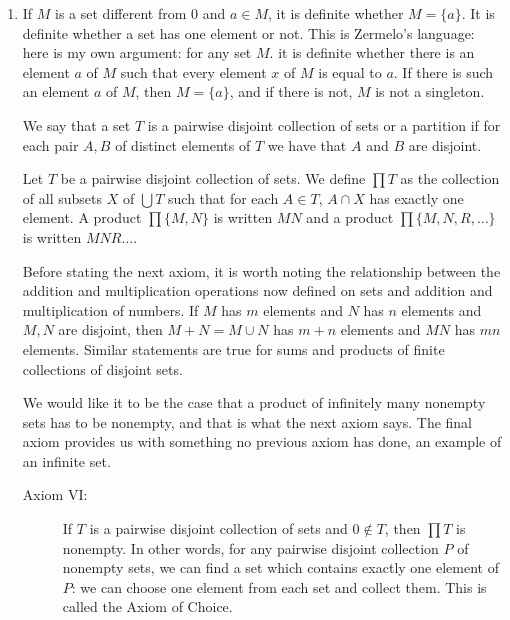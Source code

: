 \documentclass[12pt]{article}
\begin{document}
\begin{enumerate}
\item If $M$ is a set different from 0 and $a \in M$, it is definite whether $M=\{a\}$.  It is definite whether a set has one element or not.  This is Zermelo's language:  here is my own argument:  for any set $M$. it is definite whether there is an element $a$ of $M$ such that every element $x$ of $M$ is equal to $a$.  If there is such an element $a$ of $M$, then $M=\{a\}$, and if there is not, $M$ is not a singleton.

We say that a set $T$ is a pairwise disjoint collection of sets or a partition if for each pair $A,B$ of distinct elements of $T$ we have that $A$ and $B$ are disjoint.

Let $T$ be a pairwise disjoint collection of sets.  We define $\prod T$ as the collection of all subsets $X$ of $\bigcup T$ such that for each $A \in T$, $A\cap X$ has exactly one element.
A product $\prod\{M,N\}$ is written $MN$ and a product $\prod\{M,N,R,\ldots\}$ is written $MNR\ldots$.

Before stating the next axiom, it is worth noting the relationship between the addition and multiplication operations now defined on sets and addition and multiplication of numbers.
If $M$ has $m$ elements and $N$ has $n$ elements and $M,N$ are disjoint, then $M+N = M \cup N$ has $m+n$ elements and $MN$ has $mn$ elements.  Similar statements are true for sums and products of finite collections of disjoint sets.

We would like it to be the case that a product of infinitely many nonempty sets has to be nonempty, and that is what the next axiom says.  The final axiom provides us with something no previous axiom has done, an example of an infinite set.

\begin{description}

\item[Axiom VI:]  If $T$ is a pairwise disjoint collection of sets and $0 \not\in T$, then $\prod T$ is nonempty.  In other words, for any pairwise disjoint collection $P$ of nonempty sets, we can find a set which contains exactly one element of $P$:  we can choose one element from each set and collect them.  This is called the Axiom of Choice.


\end{description}
\end{enumerate}
\end{document}
